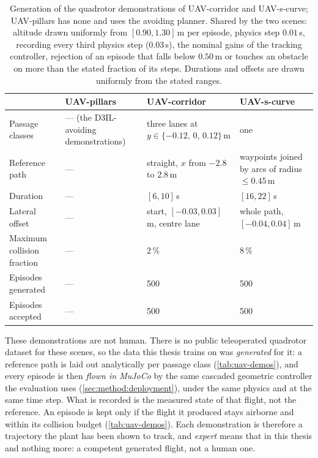 \begin{table}[!htbp]
  \caption[Quadrotor demonstrations]{Generation of the quadrotor demonstrations of UAV-corridor and
  UAV-s-curve; UAV-pillars has none and uses the avoiding planner. Shared by the two scenes:
  altitude drawn uniformly from $[0.90,1.30]$\,m per episode, physics step $0.01$\,s, recording every
  third physics step ($0.03$\,s), the nominal gains of the tracking controller, rejection of an episode
  that falls below $0.50$\,m or touches an obstacle on more than the stated fraction of its steps.
  Durations and offsets are drawn uniformly from the stated ranges.}
  \label{tab:uav-demos}
  \centering
  \footnotesize
  \setlength{\tabcolsep}{3pt}
  \renewcommand{\arraystretch}{0.92}
  \begin{tabularx}{\linewidth}{@{}l L L L@{}}
    \toprule
    & UAV-pillars & UAV-corridor & UAV-s-curve \\
    \midrule
    Passage classes & --- (the D3IL-avoiding demonstrations) & three lanes at $y\in\{-0.12,\,0,\,0.12\}$\,m & one \\
    Reference path & --- & straight, $x$ from $-2.8$ to $2.8$\,m & waypoints joined by arcs of radius $\le0.45$\,m \\
    Duration & --- & $[6,10]$\,s & $[16,22]$\,s \\
    Lateral offset & --- & start, $[-0.03,0.03]$\,m, centre lane & whole path, $[-0.04,0.04]$\,m \\
    Maximum collision fraction & --- & $2\,\%$ & $8\,\%$ \\
    Episodes generated & --- & 500 & 500 \\
    Episodes accepted & --- & 500 & 500 \\
    \bottomrule
  \end{tabularx}
\end{table}

These demonstrations are not human. There is no public teleoperated quadrotor dataset for these scenes,
so the data this thesis trains on was \emph{generated} for it: a reference path is laid out analytically
per passage class (\autoref{tab:uav-demos}), and every episode is then \emph{flown in MuJoCo} by the same
cascaded geometric controller the evaluation uses (\autoref{sec:method:deployment}), under the same
physics and at the same time step. What is recorded is the measured state of that flight, not the
reference. An episode is kept only if the flight it produced stays airborne and within its collision
budget (\autoref{tab:uav-demos}). Each
demonstration is therefore a trajectory the plant has been shown to track, and \emph{expert} means that
in this thesis and nothing more: a competent generated flight, not a human one.


